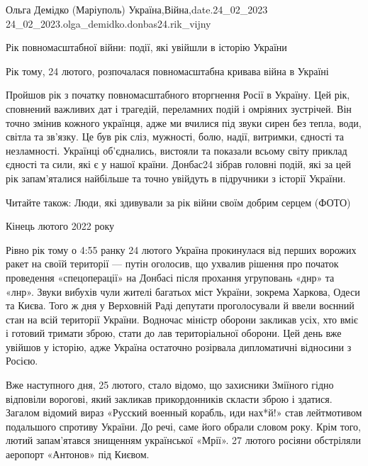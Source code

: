  
 
 
 
 

Ольга Демідко (Маріуполь)
Україна,Війна,date.24_02_2023
24_02_2023.olga_demidko.donbas24.rik_vijny

Рік повномасштабної війни: події, які увійшли в історію України

Рік тому, 24 лютого, розпочалася повномасштабна кривава війна в Україні

Пройшов рік з початку повномасштабного вторгнення Росії в Україну. Цей рік,
сповнений важливих дат і трагедій, переламних подій і омріяних зустрічей. Він
точно змінив кожного українця, адже ми вчилися під звуки сирен без тепла, води,
світла та зв'язку. Це був рік сліз, мужності, болю, надії, витримки, єдності та
незламності. Українці об'єднались, вистояли та показали всьому світу приклад
єдності та сили, які є у нашої країни. Донбас24 зібрав головні подій, які за
цей рік запам'яталися найбільше та точно увійдуть в підручники з історії
України.

Читайте також: Люди, які здивували за рік війни своїм добрим серцем (ФОТО)

Кінець лютого 2022 року

Рівно рік тому о 4:55 ранку 24 лютого Україна прокинулася від перших ворожих
ракет на своїй території — путін оголосив, що ухвалив рішення про початок
проведення «спецоперації» на Донбасі після прохання угруповань «днр» та «лнр».
Звуки вибухів чули жителі багатьох міст України, зокрема Харкова, Одеси та
Києва. Того ж дня у Верховній Раді депутати проголосували й ввели воєнний стан
на всій території України. Водночас міністр оборони закликав усіх, хто вміє і
готовий тримати зброю, стати до лав територіальної оборони. Цей день вже
увійшов у історію, адже Україна остаточно розірвала дипломатичні відносини з
Росією.

Вже наступного дня, 25 лютого, стало відомо, що захисники Зміїного гідно
відповіли ворогові, який закликав прикордонників скласти зброю і здатися.
Загалом відомий вираз «Русский военный корабль, иди нах*й!» став лейтмотивом
подальшого спротиву України. До речі, саме його обрали словом року. Крім того,
лютий запам'ятався знищенням української «Мрії». 27 лютого росіяни обстріляли
аеропорт «Антонов» під Києвом.

